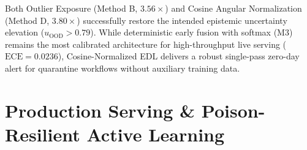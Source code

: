 \documentclass[conference]{IEEEtran}
\begin{document}
\begin{table}[htbp]
\caption{Benchmarking Architectural Solutions for Open-Set Zero-Day Detection}
\label{tab:mitigations}
\centering
{}
\vspace{1mm}
\end{table}

Both Outlier Exposure (Method B, $3.56\times$) and Cosine Angular Normalization (Method D, $3.80\times$) successfully restore the intended epistemic uncertainty elevation ($u_{\text{OOD}} > 0.79$). While deterministic early fusion with softmax (M3) remains the most calibrated architecture for high-throughput live serving ($\text{ECE} = 0.0236$), Cosine-Normalized EDL delivers a robust single-pass zero-day alert for quarantine workflows without auxiliary training data.

\section{Production Serving \& Poison-Resilient Active Learning}
\end{document}

